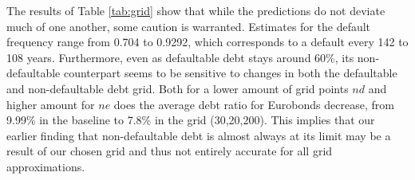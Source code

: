 The results of Table \ref{tab:grid} show that while the predictions do not deviate much of one another, some caution is warranted. Estimates for the default frequency range from 0.704 to 0.9292, which corresponds to a default every 142 to 108 years. Furthermore, even as defaultable debt stays around 60\%, its non-defaultable counterpart seems to be sensitive to changes in both the defaultable and non-defaultable debt grid. Both for a lower amount of grid points $nd$ and higher amount for $ne$ does the average debt ratio for Eurobonds decrease, from 9.99\% in the baseline to 7.8\% in the grid (30,20,200). This implies that our earlier finding that non-defaultable debt is almost always at its limit may be a result of our chosen grid and thus not entirely accurate for all grid approximations.\\
